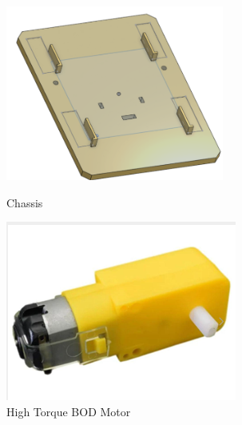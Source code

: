 \documentclass[12pt,a4paper]{report}
\begin{document}
\begin{enumerate}
\begin{itemize}
\begin{figure}[H]
    \centering
    \begin{minipage}{0.45\textwidth}
        \centering
        \includegraphics[width=\textwidth]{base}  %
        \caption{Chassis}
        \label{fig:base}
    \end{minipage} \hfill
    \begin{minipage}{0.45\textwidth}
        \centering
        \includegraphics[width=\textwidth]{bodMotor}  %
        \caption{High Torque BOD Motor}
        \label{fig:bodMotor}
    \end{minipage}
\end{figure}
        

\end{itemize}
\end{enumerate}
\end{document}
